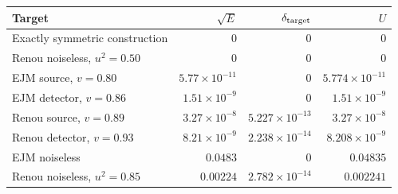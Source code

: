 \begin{tabular}{@{}lrrr@{}}\toprule
Target & $\sqrt E$ & $\delta_{\rm target}$ & $U$\\\midrule
Exactly symmetric construction & $0$ & $0$ & $0$\\
Renou noiseless, $u^2=0.50$ & $0$ & $0$ & $0$\\
EJM source, $v=0.80$ & $5.77\times10^{-11}$ & $0$ & $5.774\times10^{-11}$\\
EJM detector, $v=0.86$ & $1.51\times10^{-9}$ & $0$ & $1.51\times10^{-9}$\\
Renou source, $v=0.89$ & $3.27\times10^{-8}$ & $5.227\times10^{-13}$ & $3.27\times10^{-8}$\\
Renou detector, $v=0.93$ & $8.21\times10^{-9}$ & $2.238\times10^{-14}$ & $8.208\times10^{-9}$\\
EJM noiseless & $0.0483$ & $0$ & $0.04835$\\
Renou noiseless, $u^2=0.85$ & $0.00224$ & $2.782\times10^{-14}$ & $0.002241$\\
\bottomrule\end{tabular}

